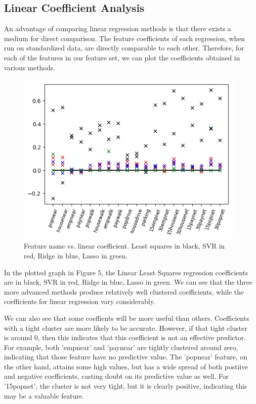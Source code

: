 \documentclass{article}
\begin{document}
\subsection{Linear Coefficient Analysis}

An advantage of comparing linear regression methods is that there exists a medium for direct comparison. The feature coefficients of each regression, when run on standardized data, are directly comparable to each other. Therefore, for each of the features in our feature set, we can plot the coefficients obtained in various methods.

\begin{figure}[H]\label{fig:f5}
\begin{center}\includegraphics[scale=1]{coef_by_type}\end{center}
\caption{Feature name vs. linear coefficient. Least squares in black, SVR in red, Ridge in blue, Lasso in green.}
\end{figure}

In the plotted graph in Figure 5, the Linear Least Squares regression coefficients are in black, SVR in red, Ridge in blue, Lasso in green. We can see that the three more advanced methods produce relatively well clustered coefficients, while the coefficients for linear regression vary considerably.

We can also see that some coeffients will be more useful than others. Coefficients with a tight cluster are more likely to be accurate. However, if that tight cluster is around 0, then this indicates that this coefficient is not an effective predictor. For example, both 'empnear' and 'paynear' are tightly clustered around zero, indicating that those feature have no predictive value. The 'popnear' feature, on the other hand, attains some high values, but has a wide spread of both postiive and negative coefficients, casting doubt on its predictive value as well. For '15popnet', the cluster is not very tight, but it is clearly positive, indicating this may be a valuable feature.
\end{document}
